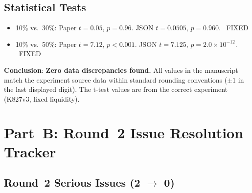 \documentclass[12pt,a4paper]{article}
\newcommand{\FIXED}{\textcolor{okgreen}{\checkmark\ FIXED}}
\begin{document}
\subsection*{Statistical Tests}

\begin{itemize}[nosep]
  \item 10\% vs.\ 30\%: Paper $t = 0.05$, $p = 0.96$. JSON $t = 0.0505$, $p = 0.960$. \FIXED
  \item 10\% vs.\ 50\%: Paper $t = 7.12$, $p < 0.001$. JSON $t = 7.125$, $p = 2.0 \times 10^{-12}$. \FIXED
\end{itemize}

\medskip

\noindent\textbf{Conclusion}: \textcolor{okgreen}{\textbf{Zero data discrepancies found.}} All values in the manuscript match the experiment source data within standard rounding conventions ($\pm 1$ in the last displayed digit). The t-test values are from the correct experiment (K827v3, fixed liquidity).


\section*{Part~B: Round~2 Issue Resolution Tracker}

\subsection*{\textcolor{errorred}{Round~2 Serious Issues (2 $\to$ 0)}}
\end{document}
